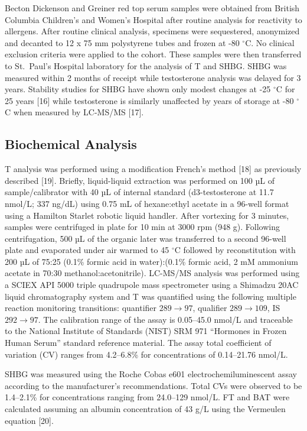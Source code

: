 \documentclass[]{elsarticle} %
\begin{document}
Becton Dickenson and Greiner red top serum samples were obtained from
British Columbia Children's and Women's Hospital after routine analysis
for reactivity to allergens. After routine clinical analysis, specimens
were sequestered, anonymized and decanted to 12 x 75 mm polystyrene
tubes and frozen at -80 \(^{\circ}\)C. No clinical exclusion criteria
were applied to the cohort. These samples were then transferred to
St.~Paul's Hospital laboratory for the analysis of T and SHBG. SHBG was
measured within 2 months of receipt while testosterone analysis was
delayed for 3 years. Stability studies for SHBG have shown only modest
changes at -25 \(^{\circ}\)C for 25 years {[}16{]} while testosterone is
similarly unaffected by years of storage at -80 \(^{\circ}\)C when
measured by LC-MS/MS {[}17{]}.

\hypertarget{biochemical-analysis}{%
\subsection{Biochemical Analysis}\label{biochemical-analysis}}

T analysis was performed using a modification French's method {[}18{]}
as previously described {[}19{]}. Briefly, liquid-liquid extraction was
performed on 100 µL of sample/calibrator with 40 µL of internal standard
(d3-testosterone at 11.7 nmol/L; 337 ng/dL) using 0.75 mL of
hexane:ethyl acetate in a 96-well format using a Hamilton Starlet
robotic liquid handler. After vortexing for 3 minutes, samples were
centrifuged in plate for 10 min at 3000 rpm (948 g). Following
centrifugation, 500 µL of the organic later was transferred to a second
96-well plate and evaporated under air warmed to 45 \(^{\circ}\)C
followed by reconstitution with 200 µL of 75:25 (0.1\% formic acid in
water):(0.1\% formic acid, 2 mM ammonium acetate in 70:30
methanol:acetonitrile). LC-MS/MS analysis was performed using a SCIEX
API 5000 triple quadrupole mass spectrometer using a Shimadzu 20AC
liquid chromatography system and T was quantified using the following
multiple reaction monitoring transitions: quantifier \(289 \to 97\),
qualifier \(289 \to 109\), IS \(292 \to 97\). The calibration range of
the assay is 0.05--45.0 nmol/L and traceable to the National Institute
of Standards (NIST) SRM 971 ``Hormones in Frozen Human Serum'' standard
reference material. The assay total coefficient of variation (CV) ranges
from 4.2--6.8\% for concentrations of 0.14--21.76 nmol/L.

SHBG was measured using the Roche Cobas e601 electrochemiluminescent
assay according to the manufacturer's recommendations. Total CVs were
observed to be 1.4--2.1\% for concentrations ranging from 24.0--129
nmol/L. FT and BAT were calculated assuming an albumin concentration of
43 g/L using the Vermeulen equation {[}20{]}.
\end{document}
